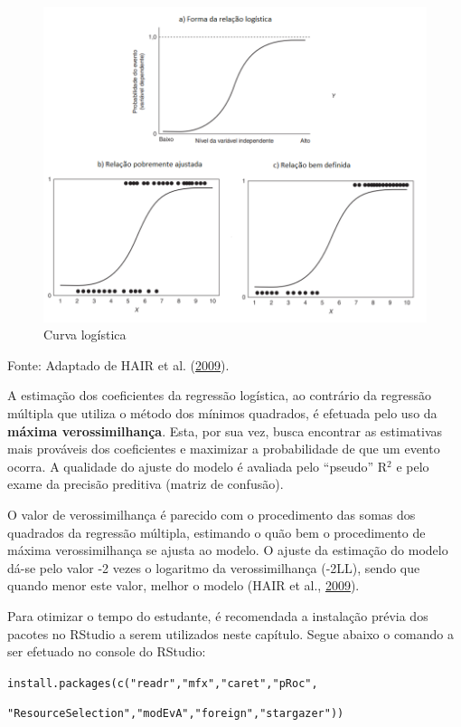 \documentclass[12pt,brazil,oneside]{book}
\begin{document}
\begin{figure}[H]

{\centering \includegraphics[width=0.8\linewidth]{curvalog} 

}

\caption{Curva logística}\label{fig:curvalog}
\end{figure}

Fonte: Adaptado de HAIR et al. (\protect\hyperlink{ref-Hair2009}{2009}).

A estimação dos coeficientes da regressão logística, ao contrário da
regressão múltipla que utiliza o método dos mínimos quadrados, é
efetuada pelo uso da \textbf{máxima verossimilhança}. Esta, por sua vez,
busca encontrar as estimativas mais prováveis dos coeficientes e
maximizar a probabilidade de que um evento ocorra. A qualidade do ajuste
do modelo é avaliada pelo ``pseudo'' R\(^2\) e pelo exame da precisão
preditiva (matriz de confusão).

O valor de verossimilhança é parecido com o procedimento das somas dos
quadrados da regressão múltipla, estimando o quão bem o procedimento de
máxima verossimilhança se ajusta ao modelo. O ajuste da estimação do
modelo dá-se pelo valor -2 vezes o logaritmo da verossimilhança (-2LL),
sendo que quando menor este valor, melhor o modelo (HAIR et al.,
\protect\hyperlink{ref-Hair2009}{2009}).

Para otimizar o tempo do estudante, é recomendada a instalação prévia
dos pacotes no RStudio a serem utilizados neste capítulo. Segue abaixo o
comando a ser efetuado no console do RStudio:

\texttt{install.packages(c("readr","mfx","caret","pRoc",}

\texttt{"ResourceSelection","modEvA","foreign","stargazer"))}
\end{document}
